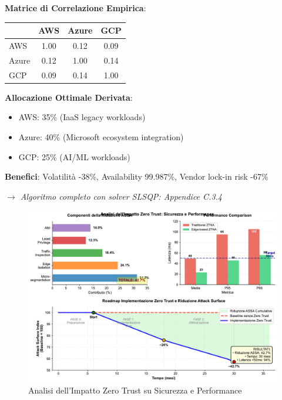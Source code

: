 \begin{refsection}
\begin{tcolorbox}
\vspace{0.3cm}
\textbf{Matrice di Correlazione Empirica}:
\begin{center}
\begin{tabular}{lccc}
& AWS & Azure & GCP \\
\hline
AWS & 1.00 & 0.12 & 0.09 \\
Azure & 0.12 & 1.00 & 0.14 \\
GCP & 0.09 & 0.14 & 1.00 \\
\end{tabular}
\end{center}

\vspace{0.3cm}
\textbf{Allocazione Ottimale Derivata}:
\begin{itemize}%
    \item AWS: 35\% (IaaS legacy workloads)
    \item Azure: 40\% (Microsoft ecosystem integration)
    \item GCP: 25\% (AI/ML workloads)
\end{itemize}

\textbf{Benefici}: Volatilità -38\%, Availability 99.987\%, Vendor lock-in risk -67\%

\textit{$\rightarrow$ Algoritmo completo con solver SLSQP: Appendice C.3.4}
\end{tcolorbox}

\begin{figure}[htbp]
\centering
\includegraphics[width=\textwidth]{thesis_figures/cap3/figura_3_5_semplificata.pdf}
\caption{Analisi dell'Impatto Zero Trust su Sicurezza e Performance}
\label{fig:zero_trust_impact}
\end{figure}

\end{refsection}
